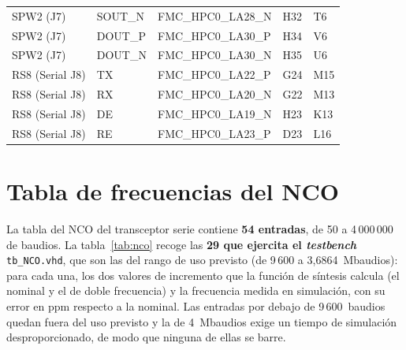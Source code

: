 {\begin{longtable}{lllll}
    SPW2 (J7) & SOUT\_N & FMC\_HPC0\_LA28\_N & H32 & T6 \\
    SPW2 (J7) & DOUT\_P & FMC\_HPC0\_LA30\_P & H34 & V6 \\
    SPW2 (J7) & DOUT\_N & FMC\_HPC0\_LA30\_N & H35 & U6 \\
    RS8 (Serial J8) & TX & FMC\_HPC0\_LA22\_P & G24 & M15 \\
    RS8 (Serial J8) & RX & FMC\_HPC0\_LA20\_N & G22 & M13 \\
    RS8 (Serial J8) & DE & FMC\_HPC0\_LA19\_N & H23 & K13 \\
    RS8 (Serial J8) & RE & FMC\_HPC0\_LA23\_P & D23 & L16 \\
    \hline
\end{longtable}
}

\section{Tabla de frecuencias del NCO} \label{anxC:nco}

La tabla del NCO del transceptor serie contiene \textbf{54 entradas}, de 50 a 4\,000\,000 de
baudios. La tabla~\ref{tab:nco} recoge las \textbf{29 que ejercita el \textit{testbench}}
\texttt{tb\_NCO.vhd}, que son las del rango de uso previsto (de 9\,600 a 3,6864~Mbaudios): para cada
una, los dos valores de incremento que la función de síntesis calcula (el nominal y el de doble
frecuencia) y la frecuencia medida en simulación, con su error en ppm respecto a la nominal. Las
entradas por debajo de 9\,600~baudios quedan fuera del uso previsto y la de 4~Mbaudios exige un
tiempo de simulación desproporcionado, de modo que ninguna de ellas se barre.


